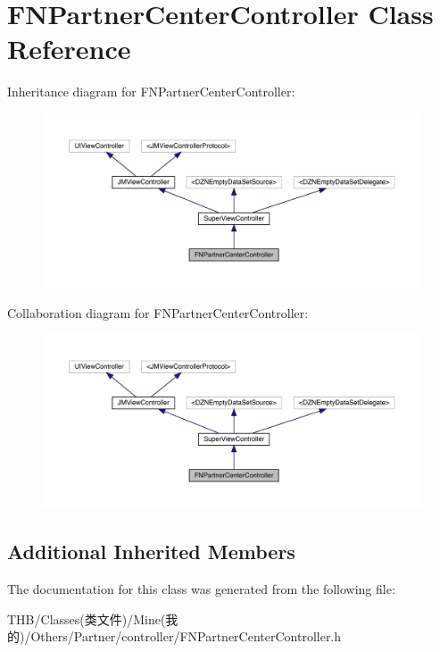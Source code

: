 \hypertarget{interface_f_n_partner_center_controller}{}\section{F\+N\+Partner\+Center\+Controller Class Reference}
\label{interface_f_n_partner_center_controller}


Inheritance diagram for F\+N\+Partner\+Center\+Controller\+:\nopagebreak
\begin{figure}[H]
\begin{center}
\leavevmode
\includegraphics[width=350pt]{interface_f_n_partner_center_controller__inherit__graph}
\end{center}
\end{figure}


Collaboration diagram for F\+N\+Partner\+Center\+Controller\+:\nopagebreak
\begin{figure}[H]
\begin{center}
\leavevmode
\includegraphics[width=350pt]{interface_f_n_partner_center_controller__coll__graph}
\end{center}
\end{figure}
\subsection*{Additional Inherited Members}


The documentation for this class was generated from the following file\+:\begin{DoxyCompactItemize}
\item 
T\+H\+B/\+Classes(类文件)/\+Mine(我的)/\+Others/\+Partner/controller/F\+N\+Partner\+Center\+Controller.\+h\end{DoxyCompactItemize}
